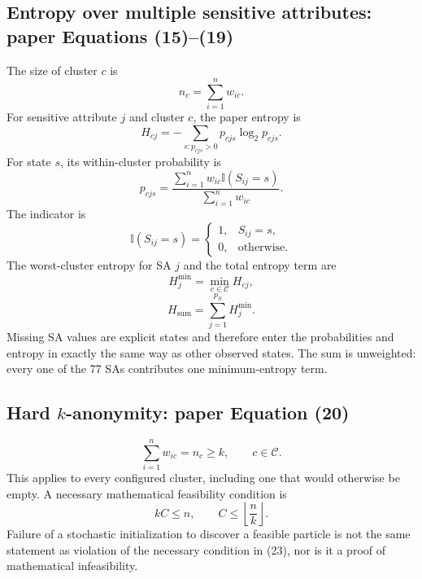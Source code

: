\documentclass[11pt,a4paper]{article}
\newcommand{\I}{\mathbb{I}}
\begin{document}
\subsection{Entropy over multiple sensitive attributes: paper Equations (15)--(19)}

The size of cluster $c$ is
\[
n_c=\sum_{i=1}^{n}w_{ic}.
\tag{$n_c$}
\]
For sensitive attribute $j$ and cluster $c$, the paper entropy is
\begin{equation}
H_{cj}=-\sum_{s:p_{cjs}>0}p_{cjs}\log_2 p_{cjs}.
\tag{P15}
\end{equation}
For state $s$, its within-cluster probability is
\begin{equation}
p_{cjs}
=\frac{\sum_{i=1}^{n}w_{ic}\I(S_{ij}=s)}
{\sum_{i=1}^{n}w_{ic}}.
\tag{P16}
\end{equation}
The indicator is
\[
\I(S_{ij}=s)=
\begin{cases}
1,&S_{ij}=s,\\
0,&\text{otherwise}.
\end{cases}
\tag{P17}
\]
The worst-cluster entropy for SA $j$ and the total entropy term are
\begin{equation}
H_j^{\min}=\min_{c\in\mathcal C}H_{cj},
\tag{P18}
\end{equation}
\begin{equation}
H_{\mathrm{sum}}=\sum_{j=1}^{p_S}H_j^{\min}.
\tag{P19}
\end{equation}
Missing SA values are explicit states and therefore enter the probabilities
and entropy in exactly the same way as other observed states.  The sum is
unweighted: every one of the 77 SAs contributes one minimum-entropy term.

\subsection{Hard \texorpdfstring{$k$}{k}-anonymity: paper Equation (20)}

\begin{equation}
\sum_{i=1}^{n}w_{ic}=n_c\ge k,
\qquad c\in\mathcal C.
\tag{P20}
\end{equation}
This applies to every configured cluster, including one that would otherwise
be empty.  A necessary mathematical feasibility condition is
\begin{equation}
kC\le n,
\qquad
C\le\left\lfloor\frac nk\right\rfloor.
\tag{23}
\end{equation}
Failure of a stochastic initialization to discover a feasible particle is not
the same statement as violation of the necessary condition in (23), nor is it
a proof of mathematical infeasibility.
\end{document}

